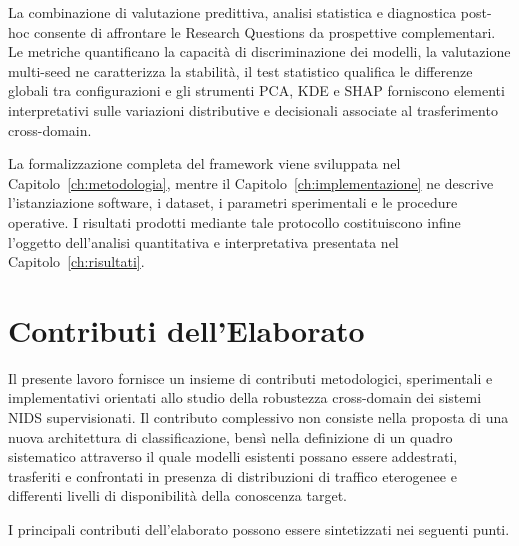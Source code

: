 La combinazione di valutazione predittiva, analisi statistica e diagnostica post-hoc consente di affrontare le Research Questions da prospettive complementari. 
Le metriche quantificano la capacità di discriminazione dei modelli, la valutazione multi-seed ne caratterizza la stabilità, il test statistico qualifica le differenze globali tra configurazioni e gli strumenti PCA, KDE e SHAP forniscono elementi interpretativi sulle variazioni distributive e decisionali associate al trasferimento cross-domain.

La formalizzazione completa del framework viene sviluppata nel Capitolo~\ref{ch:metodologia}, mentre il Capitolo~\ref{ch:implementazione} ne descrive l'istanziazione software, i dataset, i parametri sperimentali e le procedure operative. 
I risultati prodotti mediante tale protocollo costituiscono infine l'oggetto dell'analisi quantitativa e interpretativa presentata nel Capitolo~\ref{ch:risultati}.




\section{Contributi dell'Elaborato}
\label{sec:intro_contributi}

Il presente lavoro fornisce un insieme di contributi metodologici, sperimentali e implementativi orientati allo studio della robustezza cross-domain dei sistemi NIDS supervisionati. 
Il contributo complessivo non consiste nella proposta di una nuova architettura di classificazione, bensì nella definizione di un quadro sistematico attraverso il quale modelli esistenti possano essere addestrati, trasferiti e confrontati in presenza di distribuzioni di traffico eterogenee e differenti livelli di disponibilità della conoscenza target.

I principali contributi dell'elaborato possono essere sintetizzati nei seguenti punti.

